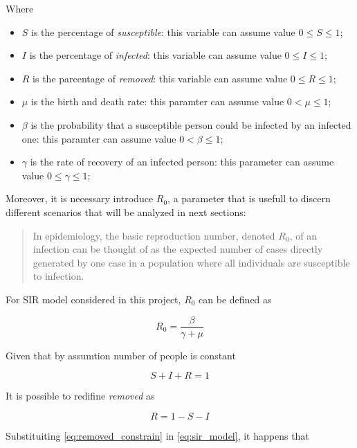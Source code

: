 Where
\begin{itemize}
    \item $S$ is the percentage of \textit{susceptible}: this variable can assume value $0 \leq S \leq 1$;
    \item $I$ is the percentage of \textit{infected}: this variable can assume value $0 \leq I \leq 1$;
    \item $R$ is the parcentage of \textit{removed}: this variable can assume value $0 \leq R \leq 1$;
    \item $\mu$ is the birth and death rate: this paramter can assume value $0 < \mu \leq 1$;
    \item $\beta$ is the probability that a susceptible person could be infected by an infected one: this paramter can assume value $0 < \beta \leq 1$;
    \item $\gamma$ is the rate of recovery of an infected person: this parameter can assume value $0 \leq \gamma \leq 1$;
\end{itemize}

Moreover, it is necessary introduce $R_0$, a parameter that is usefull to discern different scenarios that will be analyzed in next sections:
\begin{quote}
    In epidemiology, the basic reproduction number, denoted $R_0$, of an infection can be thought of as the expected number of cases directly generated by one case in a population where all individuals are susceptible to infection. \cite{bib:r0_definition}
\end{quote}

For SIR model considered in this project, $R_0$ can be defined as

\begin{equation}
    \label{eq:r0_definition}
    R_0 = \frac{\beta}{\gamma + \mu}
\end{equation}

Given that by assumtion number of people is constant

\begin{equation}
\label{eq:population_constraint}
    S + I + R = 1
\end{equation}

It is possible to redifine \textit{removed} as

\begin{equation}
\label{eq:removed_constrain}
    R = 1 - S - I
\end{equation}

Substituiting \ref{eq:removed_constrain} in \ref{eq:sir_model}, it happens that


